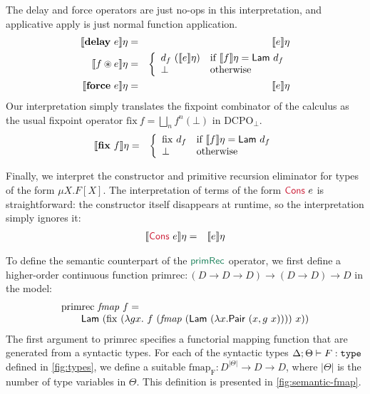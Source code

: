 The delay and force operators are just no-ops in this interpretation,
and applicative apply is just normal function application.
\begin{eqnarray*}
  \sem{\kw{delay}\ e}\eta & = & \sem{e}\eta \\
  \sem{f \circledast e}\eta & = & \left\{
    \begin{array}{ll}
      d_f\ (\sem{e}\eta) & \textrm{if}\ \sem{f}\eta = \semCons{Lam}\ d_f \\
      \bot & \textrm{otherwise}
    \end{array}
  \right. \\
  \sem{\kw{force}\ e}\eta & = & \sem{e}\eta
\end{eqnarray*}
Our interpretation simply translates the fixpoint combinator of the
calculus as the usual fixpoint operator $\mathrm{fix}\ f = \bigsqcup_n
f^n(\bot)$ in $\mathrm{DCPO}_\bot$.
\begin{eqnarray*}
  \sem{\kw{fix}\ f}\eta & = &
  \left\{
    \begin{array}{ll}
      \mathrm{fix}\ d_f & \textrm{if }\sem{f}\eta = \semCons{Lam}\ d_f \\
      \bot & \textrm{otherwise}
    \end{array}
  \right.
\end{eqnarray*}

Finally, we interpret the constructor and primitive recursion
eliminator for types of the form $\mu X. F[X]$. The interpretation of
terms of the form $\cons{Cons}\ e$ is straightforward: the constructor
itself disappears at runtime, so the interpretation simply ignores it:
\begin{eqnarray*}
  \sem{\cons{Cons}\ e}\eta & = & \sem{e}\eta
\end{eqnarray*}

To define the semantic counterpart of the $\elim{primRec}$ operator,
we first define a higher-order continuous function $\mathrm{primrec} :
(D \to D \to D) \to (D \to D) \to D$ in the model:
\begin{displaymath}
  \begin{array}{l}
    \mathrm{primrec}\ \mathit{fmap}\ f = \\
    \quad\quad\semCons{Lam}\ (\mathrm{fix}\ (\lambda g x.\ f\ (\mathit{fmap}\ (\semCons{Lam}\ (\lambda x. \semCons{Pair}\ (x, g\ x))))\ x))
  \end{array}
\end{displaymath}
The first argument to $\mathrm{primrec}$ specifies a functorial
mapping function that are generated from a syntactic types. For each
of the syntactic types $\Delta; \Theta \vdash F : \texttt{type}$ defined
in \autoref{fig:types}, we define a suitable $\mathrm{fmap_F} :
D^{|\Theta|} \to D \to D$, where $|\Theta|$ is the number of type
variables in $\Theta$. This definition is presented in
\autoref{fig:semantic-fmap}.

